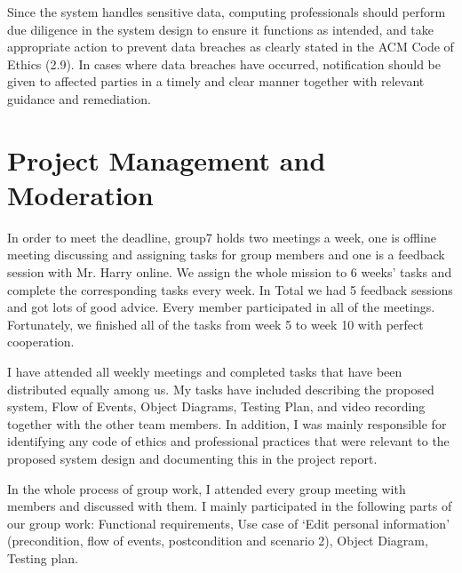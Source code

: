 \documentclass[a4paper]{article}
\begin{document}
	\par
	Since the system handles sensitive data, computing professionals should perform due diligence in the system design to ensure it functions as intended, and take appropriate action to prevent data breaches as clearly stated in the ACM Code of Ethics (2.9)\cite{ref5}. In cases where data breaches have occurred, notification should be given to affected parties in a timely and clear manner together with relevant guidance and remediation. 
	
	\newpage
	\section{Project Management and Moderation}

	In order to meet the deadline, group7 holds two meetings a week, one is offline meeting discussing and assigning tasks for group members and one is a feedback session with Mr. Harry online. We assign the whole mission to 6 weeks' tasks and complete the corresponding tasks every week. In Total we had 5 feedback sessions and got lots of good advice. Every member participated in all of the meetings. Fortunately, we finished all of the tasks from week 5 to week 10 with perfect cooperation.\\

	\par
	I have attended all weekly meetings and completed tasks that have been distributed equally among us. My tasks have included describing the proposed system, Flow of Events, Object Diagrams, Testing Plan, and video recording together with the other team members. In addition, I was mainly responsible for identifying any code of ethics and professional practices that were relevant to the proposed system design and documenting this in the project report.\\
	
	\par
	In the whole process of group work, I attended every group meeting with members and discussed with them. I mainly participated in the following parts of our group work: Functional requirements, Use case of `Edit personal information' (precondition, flow of events, postcondition and scenario 2), Object Diagram, Testing plan.\\
\end{document}
